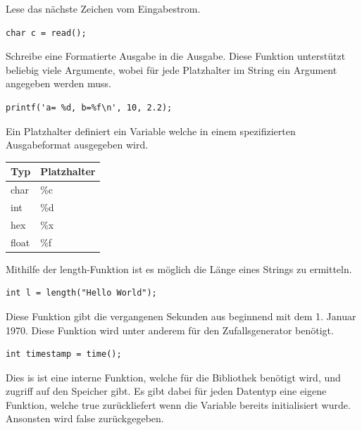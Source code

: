 
Lese das n\"achste Zeichen vom Eingabestrom.

\begin{lstlisting}[language=CMM]
char c = read();
\end{lstlisting}


Schreibe eine Formatierte Ausgabe in die Ausgabe. Diese Funktion unterst\"utzt beliebig viele Argumente, wobei f\"ur jede Platzhalter im String ein Argument angegeben werden muss.

\begin{lstlisting}[language=CMM]
printf('a= %d, b=%f\n', 10, 2.2);
\end{lstlisting}


Ein Platzhalter definiert ein Variable welche in einem spezifizierten Ausgabeformat ausgegeben wird. 

 \begin{tabular}{l | l}
  Typ & Platzhalter \\
  \hline
  char & \%c \\
  int & \%d \\
  hex & \%x \\
  float & \%f \\
 \end{tabular}


Mithilfe der length-Funktion ist es m\"oglich die L\"ange eines Strings zu ermitteln.

\begin{lstlisting}[language=CMM]
int l = length("Hello World");
\end{lstlisting}


Diese Funktion gibt die vergangenen Sekunden aus beginnend mit dem 1. Januar 1970. Diese Funktion wird unter anderem f\"ur den Zufallsgenerator ben\"otigt.

\begin{lstlisting}[language=CMM]
int timestamp = time();
\end{lstlisting}


Dies is ist eine interne Funktion, welche f\"ur die Bibliothek ben\"otigt wird, und zugriff auf den Speicher gibt. Es gibt dabei f\"ur jeden Datentyp eine eigene Funktion, welche true zur\"uckliefert wenn die Variable bereits initialisiert wurde. Ansonsten wird false zur\"uckgegeben.

